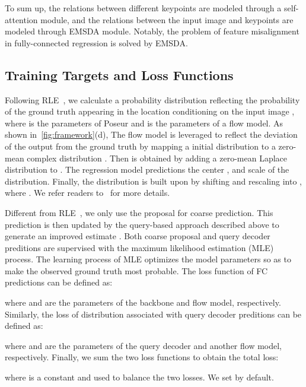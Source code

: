 \documentclass[runningheads]{llncs}
\def\handle{{Poseur}\xspace}
\begin{document}
To sum up, the relations between different keypoints are modeled through a self-attention module, and the relations between the input image and keypoints are modeled through EMSDA module. Notably, the problem of feature misalignment in fully-connected regression is solved by EMSDA. 









\subsection{Training Targets and Loss Functions}\label{sec:loss}
Following RLE~\cite{li2021rle}, we calculate a probability distribution  reflecting the probability of the ground truth appearing in the location  conditioning on the input image , where  is the parameters of \handle and  is the parameters of a flow model. As shown in~\cref{fig:framework}(d), The flow model  is leveraged to reflect the deviation of the output from the ground truth  by mapping a initial distribution  to a zero-mean complex distribution . 
Then  is obtained by adding a zero-mean Laplace distribution  to .
The regression model  predictions the center , and scale  of the distribution. Finally, the distribution  is built upon  by shifting and rescaling  into , where . We refer readers to~\cite{li2021rle} for
more details.

Different from RLE~\cite{li2021rle}, we only use the proposal  for coarse prediction. This prediction is then updated by the query-based approach described above to generate an improved estimate . Both coarse proposal  and query decoder preditions  are supervised with the maximum likelihood estimation (MLE) process. The learning process of MLE optimizes the model parameters so as to make the observed ground truth  most probable. The loss function of FC predictions  can be defined as:

where  and  are the parameters of the backbone and flow model, respectively.
Similarly, the loss of distribution associated with query decoder preditions  can be defined as:

where  and  are the parameters of the query decoder and another flow model, respectively.
Finally, we sum the two loss functions to obtain the total loss:

where  is a constant and used to balance the two losses. We set  by default.
\end{document}
